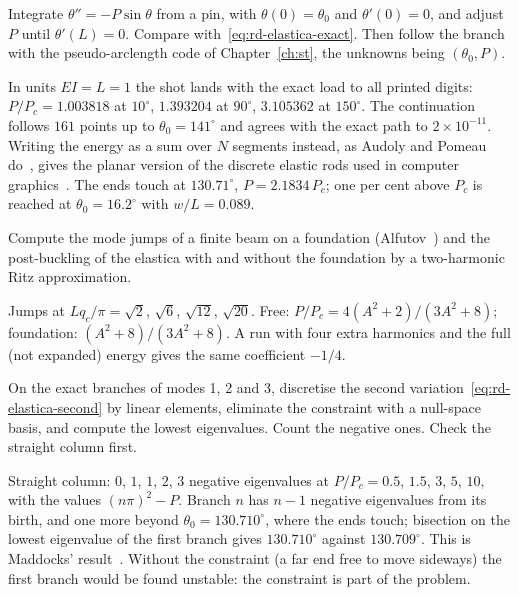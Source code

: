 
\label{exo:rd-computer-shooting}
%
Integrate $\theta'' = -P\sin\theta$ from a pin, with $\theta(0) = \theta_0$ and $\theta'(0) = 0$, and adjust $P$ until
$\theta'(L) = 0$. Compare with~\eqref{eq:rd-elastica-exact}. Then follow the branch with the
pseudo-arclength code of Chapter~\ref{ch:st}, the unknowns being $(\theta_0, P)$.
\begin{solution}
In units $EI = L = 1$ the shot lands with the exact load to all printed digits:
$P/P_c = 1.003818$ at $10^\circ$, $1.393204$ at $90^\circ$, $3.105362$ at $150^\circ$. The continuation
follows $161$ points up to $\theta_0 = 141^\circ$ and agrees with the exact path to $2\times10^{-11}$.
Writing the energy as a sum over $N$ segments instead, as Audoly and
Pomeau do~\cite[Section~A.2]{rd-audoly2010}, gives the planar version of the discrete elastic
rods used in computer graphics~\cite{rd-bergou2008}. The
ends touch at $130.71^\circ$, $P = 2.1834\,P_c$; one per cent above $P_c$ is reached at
$\theta_0 = 16.2^\circ$ with $w/L = 0.089$.

\end{solution}

\label{exo:rd-computer-foundation}
%
Compute the mode jumps of a finite beam on a foundation (Alfutov~\cite[Fig.~3.13]{rd-alfutov2000}) and the post-buckling of the elastica
with and without the foundation by a two-harmonic Ritz approximation.
\begin{solution}
Jumps at $L q_c/\pi = \sqrt2$, $\sqrt6$, $\sqrt{12}$, $\sqrt{20}$. Free: $P/P_c = 4(A^2 + 2)/(3A^2 + 8)$;
foundation: $(A^2 + 8)/(3A^2 + 8)$. A run with four extra harmonics and the full (not expanded)
energy gives the same coefficient $-1/4$.

\end{solution}

\label{exo:rd-computer-stability}
%
On the exact branches of modes 1, 2 and 3, discretise the second
variation~\eqref{eq:rd-elastica-second} by linear elements, eliminate the constraint with a
null-space basis, and compute the lowest eigenvalues. Count the negative ones. Check the straight
column first.
\begin{solution}
Straight column: $0$, $1$, $1$, $2$, $3$ negative eigenvalues at $P/P_c = 0.5$, $1.5$, $3$, $5$, $10$,
with the values $(n\pi)^2 - P$. Branch $n$ has $n - 1$ negative eigenvalues from its birth, and one more
beyond $\theta_0 = 130.710^\circ$, where the ends touch; bisection on the lowest eigenvalue of the first
branch gives $130.710^\circ$ against $130.709^\circ$. This is Maddocks' result~\cite{rd-maddocks1984}.
Without the constraint (a far end free to move sideways) the first branch would be found unstable:
the constraint is part of the problem.

\end{solution}

